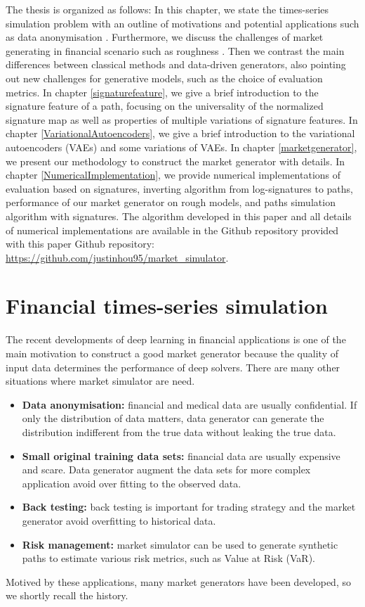 \documentclass[12pt]{report}
\theoremstyle{definition}
\theoremstyle{remark}
\begin{document}
The thesis is organized as follows: In this chapter, we state the times-series simulation problem with an outline of motivations and potential applications such as data anonymisation \cite{kondratyev2020data}. Furthermore, we discuss the challenges of market generating in financial scenario such as roughness \cite{gatheral2018volatility}. Then we contrast the main differences between classical methods and data-driven generators, also pointing out new challenges for generative models, such as the choice of evaluation metrics. In chapter \ref{signaturefeature}, we give a brief introduction to the signature feature of a path, focusing on the universality of the normalized signature map \cite{chevyrev2018signature} as well as properties of multiple variations of signature features. In chapter \ref{VariationalAutoencoders}, we give a brief introduction to the variational autoencoders (VAEs) \cite{kingma2013auto} and some variations of VAEs. In chapter \ref{marketgenerator}, we present our methodology to construct the market generator with details. In chapter \ref{NumericalImplementation}, we provide numerical implementations of evaluation based on signatures, inverting algorithm from log-signatures to paths, performance of our market generator on rough models, and paths simulation algorithm with signatures. The algorithm developed in this paper and all details of numerical implementations are available in the Github repository provided with this paper Github repository: \url{https://github.com/justinhou95/market_simulator}.

\section{Financial times-series simulation}
The recent developments of deep learning in financial applications is one of the main motivation to construct a good market generator because the quality of input data determines the performance of deep solvers. There are many other situations where market simulator are need.
\begin{itemize}
  \item  \textbf{Data anonymisation:} financial and medical data are usually confidential. If only the distribution of data matters, data generator can generate the distribution indifferent from the true data without leaking the true data. 
  \item \textbf{Small original training data sets:} financial data are usually expensive and scare. Data generator augment the data sets for more complex application avoid over fitting to the observed data.
  \item \textbf{Back testing:} back testing is important for trading strategy and the market generator avoid overfitting to historical data.
  \item \textbf{Risk management:} market simulator can be used to generate synthetic paths to estimate various risk metrics, such as Value at Risk (VaR).
\end{itemize}
Motived by these applications, many market generators have been developed, so we shortly recall the history.
\end{document}
